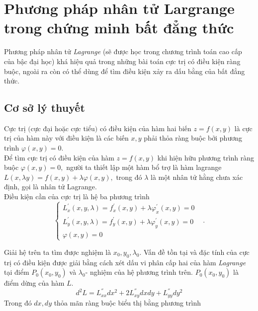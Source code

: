 \section{Phương pháp nhân tử Largrange trong chứng minh bất đẳng thức}
\noindent Phương pháp nhân tử \textit{Lagrange} (sẽ được học trong chương trình toán cao cấp của bậc đại học) khá hiệu quả trong những bài toán cực trị có điều kiện ràng buộc, ngoài ra còn có thể dùng để tìm điều kiện xảy ra dấu bằng của bất đẳng thức.

\subsection{Cơ sở lý thuyết}
\begin{dn}
	Cực trị $($cực đại hoặc cực tiểu$)$ có điều kiện của hàm hai biến $z=f\left ( x,y \right ) $ là cực trị của hàm này với điều kiện là các biến $x,y$ phải thỏa ràng buộc bởi phương trình $\varphi \left ( x,y \right )=0. $\\
	Để tìm cực trị có điều kiện của hàm $z=f\left ( x,y \right )$ khi hiện hữu phương trình ràng buộc $\varphi \left ( x,y \right )=0,$ người ta thiết lập một hàm bổ trợ là hàm lagrange $L\left ( x,\lambda y \right )=f\left ( x,y \right )+\lambda \varphi \left ( x,y \right ), $  trong đó $\lambda$ là một nhân tử hằng chưa xác định, gọi là nhân tử Lagrange.\\
	Điều kiện cần của cực trị là hệ ba phương trình 
	$$\left\{\begin{matrix}
	L_{x}^{'}\left ( x,y,\lambda  \right )=f_{x}^{'}\left ( x,y \right )+\lambda \varphi _{x}^{'}\left ( x,y \right )=0& \\ 
	L_{y}^{'} \left ( x,y,\lambda  \right )=f_{y}^{'}\left ( x,y \right )+\lambda \varphi _{y}^{'}\left ( x,y \right )=0& \\ 
	\varphi \left ( x,y \right ) =0& 
	\end{matrix}\right..  $$
\end{dn}
Giải hệ trên ta tìm được nghiệm là $x_0,y_0,\lambda _0 $. Vấn đề tồn tại và đặc tính của cực trị có điều kiện được giải bằng cách xét dấu vi phân cấp hai của hàm \textit{Lagrange} tại điểm $P_0\left ( x_0,y_0 \right )$ và $\lambda _{0} $- nghiệm của hệ phương trình trên. $P_0\left ( x_0,y_0 \right )$ là điểm dừng của hàm $L$.
$$d^{2}L=L_{xx}^{''}dx^2+2L_{xy}^{''}dxdy+L_{yy}^{''}dy^2  $$
Trong đó $dx,dy$ thỏa mãn ràng buộc biểu thị bằng phương trình 

